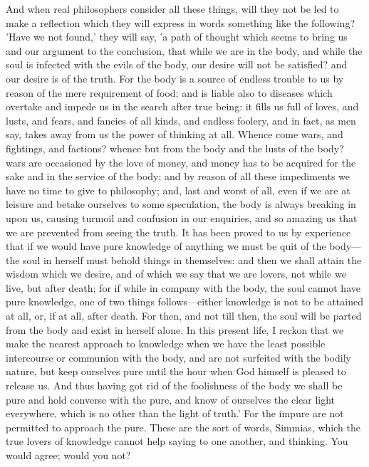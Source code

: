 \documentclass[11pt,letter]{article}
\begin{document}
\par  And when real philosophers consider all these things, will they not be led to make a reflection which they will express in words something like the following? 'Have we not found,' they will say, 'a path of thought which seems to bring us and our argument to the conclusion, that while we are in the body, and while the soul is infected with the evils of the body, our desire will not be satisfied? and our desire is of the truth. For the body is a source of endless trouble to us by reason of the mere requirement of food; and is liable also to diseases which overtake and impede us in the search after true being: it fills us full of loves, and lusts, and fears, and fancies of all kinds, and endless foolery, and in fact, as men say, takes away from us the power of thinking at all. Whence come wars, and fightings, and factions? whence but from the body and the lusts of the body? wars are occasioned by the love of money, and money has to be acquired for the sake and in the service of the body; and by reason of all these impediments we have no time to give to philosophy; and, last and worst of all, even if we are at leisure and betake ourselves to some speculation, the body is always breaking in upon us, causing turmoil and confusion in our enquiries, and so amazing us that we are prevented from seeing the truth. It has been proved to us by experience that if we would have pure knowledge of anything we must be quit of the body—the soul in herself must behold things in themselves: and then we shall attain the wisdom which we desire, and of which we say that we are lovers, not while we live, but after death; for if while in company with the body, the soul cannot have pure knowledge, one of two things follows—either knowledge is not to be attained at all, or, if at all, after death. For then, and not till then, the soul will be parted from the body and exist in herself alone. In this present life, I reckon that we make the nearest approach to knowledge when we have the least possible intercourse or communion with the body, and are not surfeited with the bodily nature, but keep ourselves pure until the hour when God himself is pleased to release us. And thus having got rid of the foolishness of the body we shall be pure and hold converse with the pure, and know of ourselves the clear light everywhere, which is no other than the light of truth.' For the impure are not permitted to approach the pure. These are the sort of words, Simmias, which the true lovers of knowledge cannot help saying to one another, and thinking. You would agree; would you not?
\end{document}
